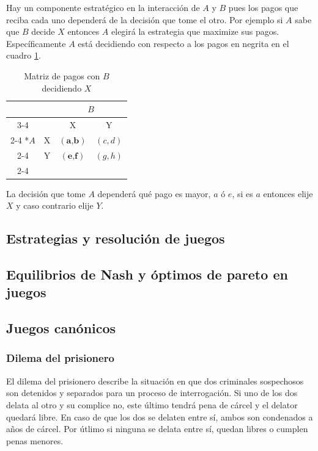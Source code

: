 Hay un componente estratégico en la interacción de $A$ y $B$ pues los pagos que reciba cada uno dependerá de la decisión que tome el otro. Por ejemplo si $A$ sabe que $B$ decide $X$ entonces $A$ elegirá la estrategia que maximize sus pagos. Específicamente $A$ está decidiendo con respecto a los pagos en negrita en el cuadro \ref{cuadro: B decide X}.

\begin{table}[!htbp]
  \centering
  \caption{Matriz de pagos con $B$ decidiendo $X$} \label{cuadro: B decide X}
  \setlength{\extrarowheight}{2pt}
  \begin{tabular}{*{4}{c|}}
    \multicolumn{2}{c}{} & \multicolumn{2}{c}{$B$}\\\cline{3-4}
    \multicolumn{1}{c}{} &  & X  & Y \\\cline{2-4}
    \multirow{2}*{$A$}  & X & $(\textbf{a,b})$ & $(c,d)$ \\\cline{2-4}
    & Y & $(\textbf{e,f})$ & $(g,h)$ \\\cline{2-4}  
  \end{tabular}
\end{table}

La decisión que tome $A$ dependerá qué pago es mayor, $a$ ó $e$, si es $a$ entonces elije $X$ y caso contrario elije $Y$.

\subsection{Estrategias y resolución de juegos}

\subsection{Equilibrios de Nash y óptimos de pareto en juegos}

\subsection{Juegos canónicos}

\subsubsection*{Dilema del prisionero}

El dilema del prisionero describe la situación en que dos criminales sospechosos son detenidos y separados para un proceso de interrogación. Si uno de los dos delata al otro y su complice no, este último tendrá pena de cárcel y el delator quedará libre. En caso de que los dos se delaten entre sí, ambos son condenados a años de cárcel. Por útlimo si ninguna se delata entre sí, quedan libres o cumplen penas menores.

